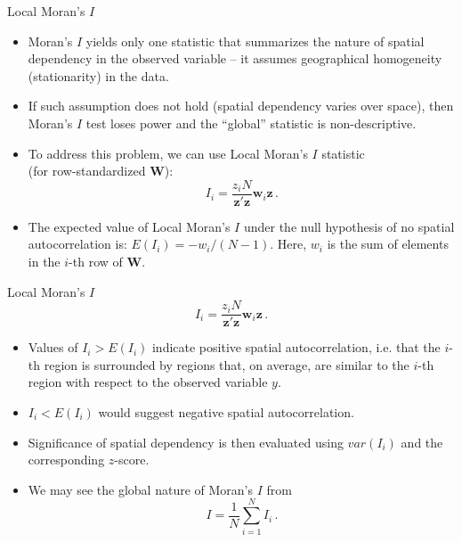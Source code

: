 \documentclass{beamer}
\begin{document}
\begin{frame}{Local Moran's $I$}
\begin{itemize}
    \item Moran's $I$ yields only one statistic that summarizes the nature of spatial dependency in the observed variable -- it assumes geographical homogeneity (stationarity) in the data. 
    \smallskip
    \item If such assumption does not hold (spatial dependency varies over space), then Moran's $I$ test loses power and the ``global'' statistic is non-descriptive. 
    \smallskip
    \item To address this problem, we can use Local Moran's $I$ statistic \\(for row-standardized $\bm{W}$):
    \begin{equation*}
    I_i = \frac{z_iN}{\bm{z}'\bm{z}}\bm{w}_{i}\bm{z} \, .
    \end{equation*}    
    \item The expected value of  Local Moran's $I$ under the null hypothesis of no spatial autocorrelation is: $E(I_i)=-w_i/(N-1)$. Here, $w_i$ is the sum of elements in the $i$-th row of $\bm{W}$.
\end{itemize}
\end{frame}
\begin{frame}{Local Moran's $I$}
    \begin{equation*}
    I_i = \frac{z_iN}{\bm{z}'\bm{z}}\bm{w}_{i}\bm{z} \, .
    \end{equation*}    
\begin{itemize}
    \item Values of $I_i > E(I_i)$ indicate positive spatial autocorrelation, i.e. that the $i$-th region is surrounded by regions that, on average, are similar to the $i$-th region with respect to the observed variable $y$. 
    \item $I_i < E(I_i)$ would suggest negative spatial autocorrelation.
    \item Significance of spatial dependency is then evaluated using $var(I_i)$ and the corresponding $z$-score.
    \bigskip
    \item We may see the global nature of Moran's $I$ from
    \begin{equation*} 
    I = \frac{1}{N}\sum_{i=1}^N I_{i} \,.
    \end{equation*}   
\end{itemize}
\end{frame}
\end{document}
